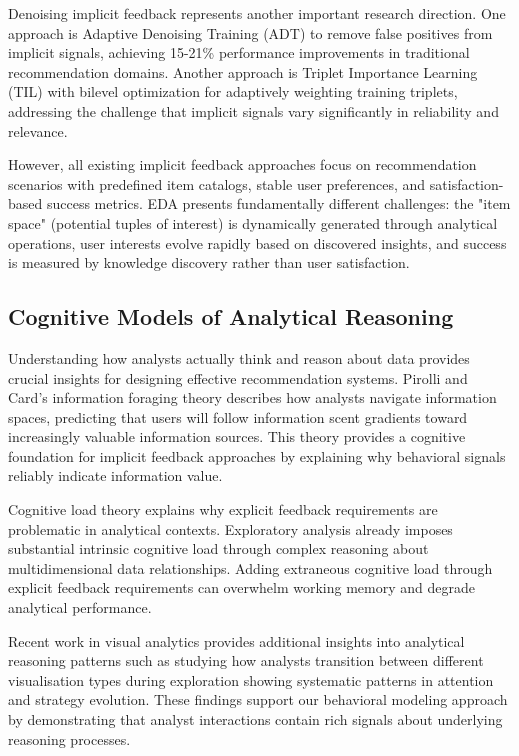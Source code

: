 \documentclass[sigconf, nonacm]{acmart}
\begin{document}
Denoising implicit feedback represents another important research direction. One approach is Adaptive Denoising Training (ADT) \cite{wang2021denoising}  to remove false positives from implicit signals, achieving 15-21\% performance improvements in traditional recommendation domains. Another approach is Triplet Importance Learning (TIL) \cite{wu2022adapting} with bilevel optimization for adaptively weighting training triplets, addressing the challenge that implicit signals vary significantly in reliability and relevance.

However, all existing implicit feedback approaches focus on recommendation scenarios with predefined item catalogs, stable user preferences, and satisfaction-based success metrics. EDA presents fundamentally different challenges: the "item space" (potential tuples of interest) is dynamically generated through analytical operations, user interests evolve rapidly based on discovered insights, and success is measured by knowledge discovery rather than user satisfaction.

\subsection{Cognitive Models of Analytical Reasoning}

Understanding how analysts actually think and reason about data provides crucial insights for designing effective recommendation systems. Pirolli and Card's information foraging theory \cite{pirolli2005information} describes how analysts navigate information spaces, predicting that users will follow information scent gradients toward increasingly valuable information sources. This theory provides a cognitive foundation for implicit feedback approaches by explaining why behavioral signals reliably indicate information value.

Cognitive load theory \cite{sweller1988cognitive} explains why explicit feedback requirements are problematic in analytical contexts. Exploratory analysis already imposes substantial intrinsic cognitive load through complex reasoning about multidimensional data relationships. Adding extraneous cognitive load through explicit feedback requirements can overwhelm working memory and degrade analytical performance.

Recent work in visual analytics provides additional insights into analytical reasoning patterns such as studying how analysts transition between different visualisation types during exploration \cite{liu2018bridging} showing systematic patterns in attention and strategy evolution. These findings support our behavioral modeling approach by demonstrating that analyst interactions contain rich signals about underlying reasoning processes.
\end{document}
